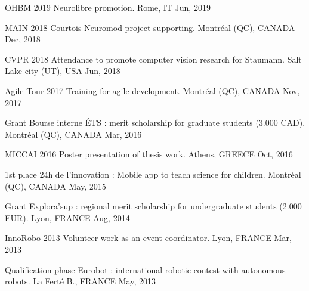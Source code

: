 


\begin{cvhonors}

\cvhonor
{OHBM 2019} %
{Neurolibre promotion.} %
{Rome, IT} %
{Jun, 2019}

\cvhonor
{MAIN 2018} %
{Courtois Neuromod project supporting.} %
{\hspace{-5mm}Montréal (QC), CANADA} %
{Dec, 2018}

\cvhonor
{CVPR 2018} %
{Attendance to promote computer vision research for Staumann.} %
{\hspace{-5mm}Salt Lake city (UT), USA} %
{Jun, 2018} %

\cvhonor
{Agile Tour 2017} %
{Training for agile development.} %
{\hspace{-5mm}Montréal (QC), CANADA} %
{Nov, 2017} %

\cvhonor
{Grant} %
{Bourse interne ÉTS : merit scholarship for graduate students (3.000 CAD).} %
{\hspace{-5mm}Montréal (QC), CANADA} %
{Mar, 2016} %

\cvhonor
{MICCAI 2016} %
{Poster presentation of thesis work.} %
{Athens, GREECE} %
{Oct, 2016} %

\cvhonor
{1st place} %
{24h de l'innovation : Mobile app to teach science for children.} %
{\hspace{-5mm}Montréal (QC), CANADA} %
{May, 2015} %


\cvhonor
{Grant} %
{Explora'sup : regional merit scholarship for undergraduate students (2.000 EUR).} %
{Lyon, FRANCE} %
{Aug, 2014} %

\cvhonor
{InnoRobo 2013} %
{Volunteer work as an event coordinator.} %
{Lyon, FRANCE} %
{Mar, 2013} %

\cvhonor
{Qualification phase} %
{Eurobot : international robotic contest with autonomous robots.} %
{La Ferté B., FRANCE} %
{May, 2013} %

\end{cvhonors}
